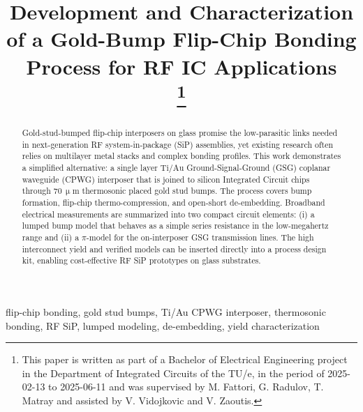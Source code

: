 \documentclass[conference]{IEEEtran}
\begin{document}
\title{Development and Characterization of a Gold-Bump Flip-Chip Bonding Process for RF IC Applications\\
\thanks{This paper is written as part of a Bachelor of Electrical Engineering project in the Department of Integrated Circuits of the TU/e, in the period of 2025-02-13 to 2025-06-11 and was supervised by M. Fattori, G. Radulov, T. Matray and assisted by V. Vidojkovic and V. Zaoutis.}
}

\author{
}

\maketitle
\thispagestyle{plain}
\pagestyle{plain}

\begin{abstract}
Gold-stud-bumped flip-chip interposers on glass promise the low-parasitic links needed in next-generation RF system-in-package (SiP) assemblies, yet existing research often relies on multilayer metal stacks and complex bonding profiles. This work demonstrates a simplified alternative: a single layer \(\mathrm{Ti}/\mathrm{Au}\) Ground-Signal-Ground (GSG) coplanar waveguide (CPWG) interposer that is joined to silicon Integrated Circuit chips through \(70\,\upmu\text{m}\) thermosonic placed gold stud bumps. The process covers bump formation, flip-chip thermo-compression, and open-short de-embedding. Broadband electrical measurements are summarized into two compact circuit elements: (i) a lumped bump model that behaves as a simple series resistance in the low-megahertz range and (ii) a \(\pi\)-model for the on-interposer GSG transmission lines. The high interconnect yield and verified models can be inserted directly into a process design kit, enabling cost-effective RF SiP prototypes on glass substrates.
\end{abstract}

\begin{IEEEkeywords}
flip-chip bonding, gold stud bumps, Ti/Au CPWG interposer, thermosonic bonding, RF SiP, lumped modeling, de-embedding, yield characterization
\end{IEEEkeywords}

\IEEEpeerreviewmaketitle
\end{document}
